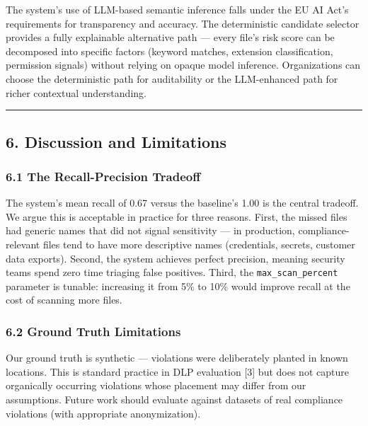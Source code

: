 \documentclass[
]{article}
\begin{document}
The system's use of LLM-based semantic inference falls under the EU AI
Act's requirements for transparency and accuracy. The deterministic
candidate selector provides a fully explainable alternative path ---
every file's risk score can be decomposed into specific factors (keyword
matches, extension classification, permission signals) without relying
on opaque model inference. Organizations can choose the deterministic
path for auditability or the LLM-enhanced path for richer contextual
understanding.

\begin{center}\rule{0.5\linewidth}{0.5pt}\end{center}

\subsection{6. Discussion and
Limitations}\label{discussion-and-limitations}

\subsubsection{6.1 The Recall-Precision
Tradeoff}\label{the-recall-precision-tradeoff}

The system's mean recall of 0.67 versus the baseline's 1.00 is the
central tradeoff. We argue this is acceptable in practice for three
reasons. First, the missed files had generic names that did not signal
sensitivity --- in production, compliance-relevant files tend to have
more descriptive names (credentials, secrets, customer data exports).
Second, the system achieves perfect precision, meaning security teams
spend zero time triaging false positives. Third, the
\texttt{max\_scan\_percent} parameter is tunable: increasing it from 5\%
to 10\% would improve recall at the cost of scanning more files.

\subsubsection{6.2 Ground Truth
Limitations}\label{ground-truth-limitations}

Our ground truth is synthetic --- violations were deliberately planted
in known locations. This is standard practice in DLP evaluation {[}3{]}
but does not capture organically occurring violations whose placement
may differ from our assumptions. Future work should evaluate against
datasets of real compliance violations (with appropriate anonymization).
\end{document}
